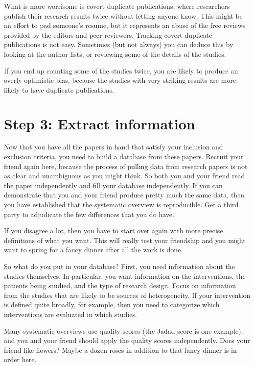\documentclass[
  letterpaper,
  DIV=11,
  numbers=noendperiod]{scrreprt}
\begin{document}
\begin{tcolorbox}
What is more worrisome is covert duplicate publications, where
researchers publish their research results twice without letting anyone
know. This might be an effort to pad someone's resume, but it represents
an abuse of the free reviews provided by the editors and peer reviewers.
Tracking covert duplicate publications is not easy. Sometimes (but not
always) you can deduce this by looking at the author lists, or reviewing
some of the details of the studies.

If you end up counting some of the studies twice, you are likely to
produce an overly optimistic bias, because the studies with very
striking results are more likely to have duplicate publications.

\section{Step 3: Extract information}\label{step-3-extract-information}

Now that you have all the papers in hand that satisfy your inclusion and
exclusion criteria, you need to build a database from these papers.
Recruit your friend again here, because the process of pulling data from
research papers is not as clear and unambiguous as you might think. So
both you and your friend read the paper independently and fill your
database independently. If you can demonstrate that you and your friend
produce pretty much the same data, then you have established that the
systematic overview is reproducible. Get a third party to adjudicate the
few differences that you do have.

If you disagree a lot, then you have to start over again with more
precise definitions of what you want. This will really test your
friendship and you might want to spring for a fancy dinner after all the
work is done.

So what do you put in your database? First, you need information about
the studies themselves. In particular, you want information on the
interventions, the patients being studied, and the type of research
design. Focus on information from the studies that are likely to be
sources of heterogeneity. If your intervention is defined quite broadly,
for example, then you need to categorize which interventions are
evaluated in which studies.

Many systematic overviews use quality scores (the Jadad score is one
example), and you and your friend should apply the quality scores
independently. Does your friend like flowers? Maybe a dozen roses in
addition to that fancy dinner is in order here.


\end{tcolorbox}
\end{document}
